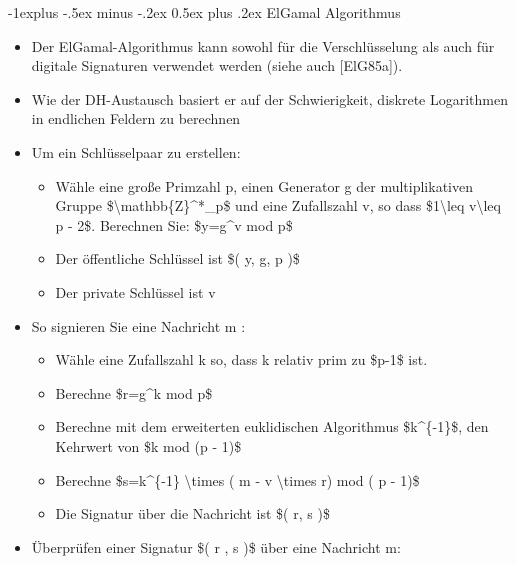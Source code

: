 \documentclass[a4paper]{article}
\makeatletter
\renewcommand{\subsection}{\@startsection{subsection}{2}{0mm}%
 {-1explus -.5ex minus -.2ex}%
 {0.5ex plus .2ex}%
 {\normalfont\normalsize\bfseries}}
\makeatother
\begin{document}
\begin{multicols}{3}
    \subsection{ElGamal Algorithmus}

    \begin{itemize}
        \item
              Der ElGamal-Algorithmus kann sowohl für die Verschlüsselung als auch
              für digitale Signaturen verwendet werden (siehe auch {[}ElG85a{]}).
        \item
              Wie der DH-Austausch basiert er auf der Schwierigkeit, diskrete
              Logarithmen in endlichen Feldern zu berechnen
        \item
              Um ein Schlüsselpaar zu erstellen:

              \begin{itemize}
                  \item
                        Wähle eine große Primzahl p, einen Generator g der multiplikativen
                        Gruppe \$\textbackslash mathbb\{Z\}\^{}*\_p\$ und eine Zufallszahl
                        v, so dass \$1\textbackslash leq v\textbackslash leq p - 2\$.
                        Berechnen Sie: \$y=g\^{}v mod p\$
                  \item
                        Der öffentliche Schlüssel ist \$( y, g, p )\$
                  \item
                        Der private Schlüssel ist v
              \end{itemize}
        \item
              So signieren Sie eine Nachricht m :

              \begin{itemize}
                  \item
                        Wähle eine Zufallszahl k so, dass k relativ prim zu \$p-1\$ ist.
                  \item
                        Berechne \$r=g\^{}k mod p\$
                  \item
                        Berechne mit dem erweiterten euklidischen Algorithmus
                        \$k\^{}\{-1\}\$, den Kehrwert von \$k mod (p - 1)\$
                  \item
                        Berechne \$s=k\^{}\{-1\} \textbackslash times ( m - v
                        \textbackslash times r) mod ( p - 1)\$
                  \item
                        Die Signatur über die Nachricht ist \$( r, s )\$
              \end{itemize}
        \item
              Überprüfen einer Signatur \$( r , s )\$ über eine Nachricht m:


\end{itemize}
\end{multicols}
\end{document}
